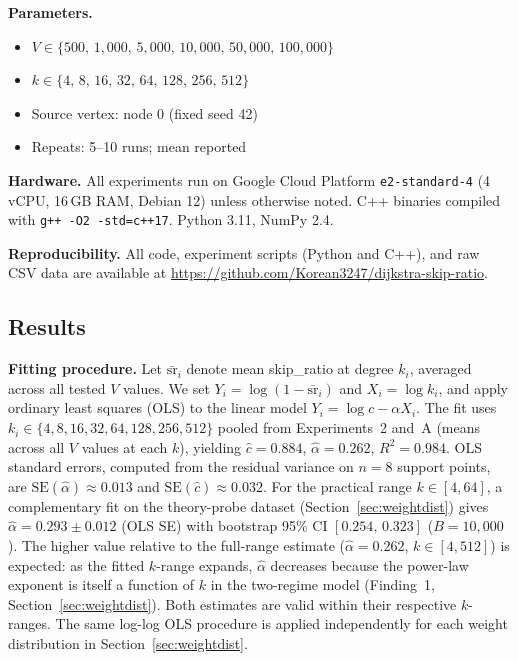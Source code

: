 \documentclass[conference]{IEEEtran}
\begin{document}
\noindent\textbf{Parameters.}
\begin{itemize}
  \item $V\in\{500,\,1{,}000,\,5{,}000,\,10{,}000,\,50{,}000,\,100{,}000\}$
  \item $k\in\{4,\,8,\,16,\,32,\,64,\,128,\,256,\,512\}$
  \item Source vertex: node 0 (fixed seed 42)
  \item Repeats: 5--10 runs; mean reported
\end{itemize}

\noindent\textbf{Hardware.}
All experiments run on Google Cloud Platform \texttt{e2-standard-4}
(4 vCPU, 16\,GB RAM, Debian 12) unless otherwise noted.
C++ binaries compiled with \texttt{g++ -O2 -std=c++17}.
Python 3.11, NumPy 2.4.

\noindent\textbf{Reproducibility.}
All code, experiment scripts (Python and C++), and raw CSV data are
available at \url{https://github.com/Korean3247/dijkstra-skip-ratio}.

\subsection{Results}

\noindent\textbf{Fitting procedure.}
Let $\bar{\mathrm{sr}}_i$ denote mean skip\_ratio at degree $k_i$,
averaged across all tested $V$ values.  We set
$Y_i = \log(1-\bar{\mathrm{sr}}_i)$ and $X_i = \log k_i$, and apply
ordinary least squares (OLS) to the linear model
$Y_i = \log c - \alpha X_i$.
The fit uses $k_i \in \{4,8,16,32,64,128,256,512\}$ pooled from
Experiments~2 and~A (means across all $V$ values at each $k$),
yielding $\hat{c}=0.884$, $\hat{\alpha}=0.262$, $R^2=0.984$.
OLS standard errors, computed from the residual variance on $n=8$
support points, are $\mathrm{SE}(\hat\alpha)\approx 0.013$ and
$\mathrm{SE}(\hat c)\approx 0.032$.
For the practical range $k\in[4,64]$, a complementary fit on the
theory-probe dataset (Section~\ref{sec:weightdist}) gives
$\hat{\alpha}=0.293\pm 0.012$ (OLS SE) with bootstrap 95\% CI
$[0.254,\,0.323]$ ($B{=}10{,}000$).
The higher value relative to the full-range estimate ($\hat\alpha=0.262$,
$k\in[4,512]$) is expected: as the fitted $k$-range expands,
$\hat\alpha$ decreases because the power-law exponent is itself a
function of $k$ in the two-regime model (Finding~1,
Section~\ref{sec:weightdist}).  Both estimates are valid within their
respective $k$-ranges.
The same log-log OLS procedure is applied independently for each weight
distribution in Section~\ref{sec:weightdist}.
\end{document}
